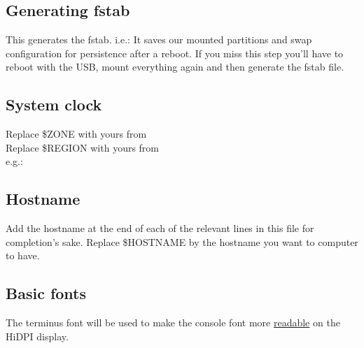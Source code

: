 \subsection{Generating fstab}

\begin{blocksection}
    This generates the fstab. i.e.: It saves our mounted partitions and swap configuration for persistence after a reboot. If you miss this step you'll have to reboot with the USB, mount everything again and then generate the fstab file.
\end{blocksection}

\subsection{System clock}

\begin{blocksection}
    Replace \textcolor{codekeyword1}{\$ZONE} with yours from \\
    Replace \textcolor{codekeyword1}{\$REGION} with yours from \\
    e.g.: 
\end{blocksection}

\subsection{Hostname}

\begin{blocksection}
    Add the hostname at the end of each of the relevant lines in this file for completion's sake. Replace \textcolor{codekeyword1}{\$HOSTNAME} by the hostname you want to computer to have.
\end{blocksection}

\subsection{Basic fonts}

\begin{blocksection}
    The terminus font will be used to make the console font more \href{https://wiki.archlinux.org/index.php/HiDPI#Linux_console}{readable} on the HiDPI display.
\end{blocksection}


